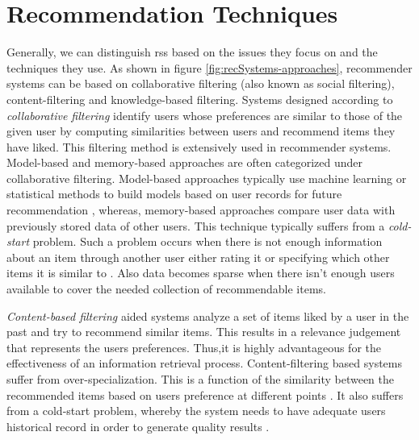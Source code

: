 \section{Recommendation Techniques}
Generally, we can distinguish \Glspl{rs}  based on the issues they focus on and the techniques they use. As shown in figure \ref{fig:recSystems-approaches}, recommender systems can be based on collaborative filtering (also known as social filtering), content-filtering and knowledge-based filtering.
Systems designed according to \textit{collaborative filtering} identify users whose preferences are similar to those of the given user by computing similarities between users and recommend items they have liked\parencite{Balabanovic1997Content-BasedRecommendation}. This filtering method is extensively used in recommender systems. Model-based and memory-based approaches are often categorized under collaborative filtering. Model-based approaches typically use machine learning or statistical methods to build models based on user records for future recommendation \parencite{Chu2012DoesImages}, whereas, memory-based approaches compare user data with previously stored data of other users\parencite{Schiaffino2006PoliteAgents}. This technique typically suffers from a \textit{cold-start} problem. Such a problem occurs when there is not enough information about an item through another user 
either rating it or specifying which other items it is similar to \parencite{Balabanovic1997Content-BasedRecommendation}. Also data becomes sparse when there isn't enough users available to cover the needed collection of recommendable items.

\textit{Content-based filtering} aided systems\parencite{LianContent-awareData, GaoContent-awareNetworks} analyze a set of items liked by a user in the past and try to recommend similar items. This results in a relevance judgement that represents the users preferences. Thus,it is highly advantageous for the effectiveness of an information retrieval process. Content-filtering based systems suffer from over-specialization. This is a function of the similarity between the recommended items based on users preference at different points \parencite{Lops2011Content-basedTrends}. It also suffers from a cold-start problem, whereby the system needs to have adequate users historical record in order to generate quality results \parencite{Burke2002HybridInteraction}. 

